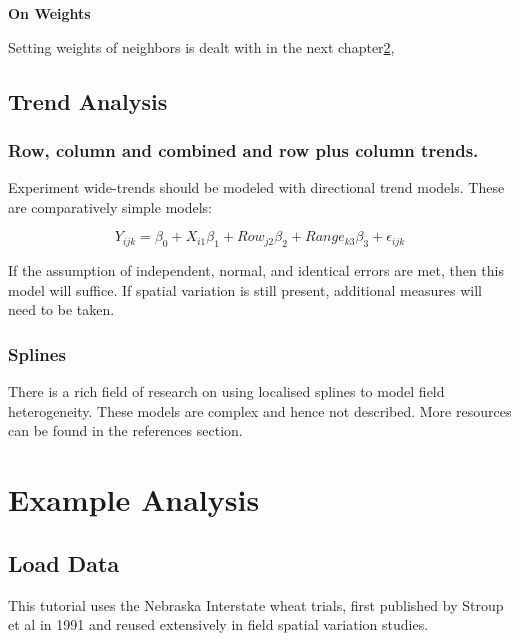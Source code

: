 \documentclass[]{book}
\begin{document}
\textbf{On Weights}

Setting weights of neighbors is dealt with in the next chapter\ref{ch3},

\hypertarget{trend-analysis}{%
\section{Trend Analysis}\label{trend-analysis}}

\hypertarget{row-column-and-combined-and-row-plus-column-trends.}{%
\subsection{Row, column and combined and row plus column trends.}\label{row-column-and-combined-and-row-plus-column-trends.}}

Experiment wide-trends should be modeled with directional trend models. These are comparatively simple models:

\[Y_{ijk} = \beta_0 + X_{i1}\beta_1 +  Row_{j2}\beta_2 + Range_{k3}\beta_3 +\epsilon_{ijk}\]

If the assumption of independent, normal, and identical errors are met, then this model will suffice. If spatial variation is still present, additional measures will need to be taken.

\hypertarget{splines}{%
\subsection{Splines}\label{splines}}

There is a rich field of research on using localised splines to model field heterogeneity. These models are complex and hence not described. More resources can be found in the references section.

\hypertarget{ch3}{%
\chapter{Example Analysis}\label{ch3}}

\hypertarget{load-data}{%
\section{Load Data}\label{load-data}}

This tutorial uses the Nebraska Interstate wheat trials, first published by Stroup et al in 1991 and reused extensively in field spatial variation studies.
\end{document}
